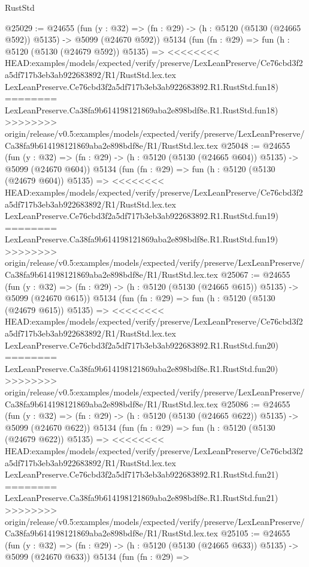 \begin{lexlean}{RustStd}
\begin{coremodule}
{\begin{coremodule}
{{{{{{{{{{{{{{{{{{{{{{{{{{{{{{{@25029 := @24655
    (fun (y : @32) => (fn : @29) -> (h : @5120 (@5130 (@24665 @592)) @5135) -> @5099 (@24670 @592))
    @5134
    (fun (fn : @29) =>
    fun (h : @5120 (@5130 (@24679 @592)) @5135) =>
<<<<<<<< HEAD:examples/models/expected/verify/preserve/LexLeanPreserve/Ce76cbd3f2a5df717b3eb3ab922683892/R1/RustStd.lex.tex
    LexLeanPreserve.Ce76cbd3f2a5df717b3eb3ab922683892.R1.RustStd.fun18)
========
    LexLeanPreserve.Ca38fa9b614198121869aba2e898bdf8e.R1.RustStd.fun18)
>>>>>>>> origin/release/v0.5:examples/models/expected/verify/preserve/LexLeanPreserve/Ca38fa9b614198121869aba2e898bdf8e/R1/RustStd.lex.tex
@25048 := @24655
    (fun (y : @32) => (fn : @29) -> (h : @5120 (@5130 (@24665 @604)) @5135) -> @5099 (@24670 @604))
    @5134
    (fun (fn : @29) =>
    fun (h : @5120 (@5130 (@24679 @604)) @5135) =>
<<<<<<<< HEAD:examples/models/expected/verify/preserve/LexLeanPreserve/Ce76cbd3f2a5df717b3eb3ab922683892/R1/RustStd.lex.tex
    LexLeanPreserve.Ce76cbd3f2a5df717b3eb3ab922683892.R1.RustStd.fun19)
========
    LexLeanPreserve.Ca38fa9b614198121869aba2e898bdf8e.R1.RustStd.fun19)
>>>>>>>> origin/release/v0.5:examples/models/expected/verify/preserve/LexLeanPreserve/Ca38fa9b614198121869aba2e898bdf8e/R1/RustStd.lex.tex
@25067 := @24655
    (fun (y : @32) => (fn : @29) -> (h : @5120 (@5130 (@24665 @615)) @5135) -> @5099 (@24670 @615))
    @5134
    (fun (fn : @29) =>
    fun (h : @5120 (@5130 (@24679 @615)) @5135) =>
<<<<<<<< HEAD:examples/models/expected/verify/preserve/LexLeanPreserve/Ce76cbd3f2a5df717b3eb3ab922683892/R1/RustStd.lex.tex
    LexLeanPreserve.Ce76cbd3f2a5df717b3eb3ab922683892.R1.RustStd.fun20)
========
    LexLeanPreserve.Ca38fa9b614198121869aba2e898bdf8e.R1.RustStd.fun20)
>>>>>>>> origin/release/v0.5:examples/models/expected/verify/preserve/LexLeanPreserve/Ca38fa9b614198121869aba2e898bdf8e/R1/RustStd.lex.tex
@25086 := @24655
    (fun (y : @32) => (fn : @29) -> (h : @5120 (@5130 (@24665 @622)) @5135) -> @5099 (@24670 @622))
    @5134
    (fun (fn : @29) =>
    fun (h : @5120 (@5130 (@24679 @622)) @5135) =>
<<<<<<<< HEAD:examples/models/expected/verify/preserve/LexLeanPreserve/Ce76cbd3f2a5df717b3eb3ab922683892/R1/RustStd.lex.tex
    LexLeanPreserve.Ce76cbd3f2a5df717b3eb3ab922683892.R1.RustStd.fun21)
========
    LexLeanPreserve.Ca38fa9b614198121869aba2e898bdf8e.R1.RustStd.fun21)
>>>>>>>> origin/release/v0.5:examples/models/expected/verify/preserve/LexLeanPreserve/Ca38fa9b614198121869aba2e898bdf8e/R1/RustStd.lex.tex
@25105 := @24655
    (fun (y : @32) => (fn : @29) -> (h : @5120 (@5130 (@24665 @633)) @5135) -> @5099 (@24670 @633))
    @5134
    (fun (fn : @29) =>
}}}}}}}}}}}}}}}}}}}}}}}}}}}}}}}
\end{coremodule}}
\end{coremodule}
\end{lexlean}
